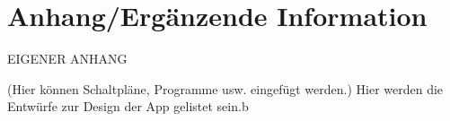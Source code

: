 %
%
% 
% 

\chapter{Anhang/Ergänzende Information}
\label{chap:app}

EIGENER ANHANG

(Hier können Schaltpläne, Programme usw. eingefügt werden.)
Hier werden die Entwürfe zur Design der App gelistet sein.b
\clearpage


\listoffigures

\clearpage


\listoftables

\clearpage






\nocite{book:Xamarin.Forms-Succinctly}
\nocite{book:Xamarin.Forms-Essentials:}
\nocite{book:Cross-platform-UI-Development-with-Xamarin.Forms}
\nocite{book:Xamarin-Mobile-Application-Development}
\nocite{Amer2016}
\nocite{Oleksandr2015}
\nocite{8016193}
\nocite{Mukesh2016}
\nocite{Soylemez2017}
\nocite{Maximilian2017}



